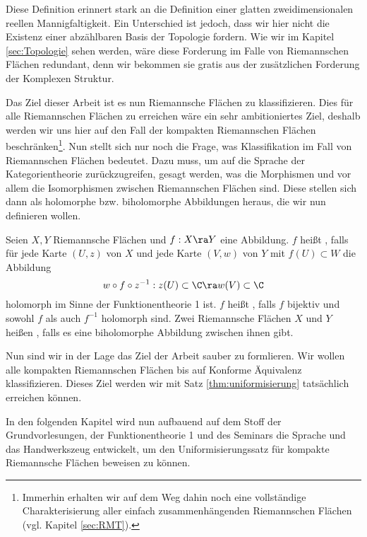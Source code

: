 Diese Definition erinnert stark an die Definition einer glatten
zweidimensionalen reellen Mannigfaltigkeit. Ein Unterschied ist
jedoch, dass wir hier nicht die Existenz einer abzählbaren Basis der
Topologie fordern. Wie wir im Kapitel \ref{sec:Topologie}
sehen werden, wäre diese Forderung im Falle von Riemannschen Flächen
redundant, denn wir bekommen sie gratis aus der zusätzlichen Forderung
der Komplexen Struktur.

Das Ziel dieser Arbeit ist es nun Riemannsche Flächen zu
klassifizieren. Dies für alle Riemannschen Flächen zu erreichen wäre
ein sehr ambitioniertes Ziel, deshalb werden wir uns hier auf den Fall
der kompakten Riemannschen Flächen beschränken\footnote{Immerhin
  erhalten wir auf dem Weg dahin noch eine vollständige
  Charakterisierung aller einfach zusammenhängenden Riemannschen
  Flächen (vgl. Kapitel \ref{sec:RMT}).}. Nun stellt sich nur noch die
Frage, was Klassifikation im Fall von Riemannschen Flächen
bedeutet. Dazu muss, um auf die Sprache der Kategorientheorie
zurückzugreifen, gesagt werden, was die Morphismen und vor allem die
Isomorphismen zwischen Riemannschen Flächen sind. Diese stellen sich
dann als holomorphe bzw. biholomorphe Abbildungen heraus, die wir nun
definieren wollen.

\begin{defin}
  Seien $X,Y$ Riemannsche Flächen und $f: X \ra Y$ eine Abbildung. $f$
  heißt , falls für jede Karte $(U,z)$ von $X$ und
  jede Karte $(V, w)$ von $Y$ mit $f(U) \subset W$ die Abbildung
  \[
  w \circ f \circ z^{-1} : z(U) \subset \C \ra w(V) \subset \C
  \]
  holomorph im Sinne der Funktionentheorie 1 ist. $f$ heißt
  , falls $f$ bijektiv und sowohl $f$ als auch $f^{-1}$
  holomorph sind. Zwei Riemannsche Flächen $X$ und $Y$ heißen , falls es eine biholomorphe Abbildung zwischen ihnen gibt.
\end{defin}

Nun sind wir in der Lage das Ziel der Arbeit sauber zu
formlieren. Wir wollen alle kompakten Riemannschen Flächen bis auf
Konforme Äquivalenz klassifizieren. Dieses Ziel werden wir mit Satz
\ref{thm:uniformisierung} tatsächlich erreichen können. 

In den folgenden Kapitel wird nun aufbauend auf dem Stoff der
Grundvorlesungen, der Funktionentheorie 1 und des Seminars die Sprache
und das Handwerkszeug entwickelt, um den Uniformisierungssatz für
kompakte Riemannsche Flächen beweisen zu können.


